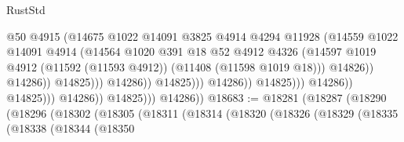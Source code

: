 \begin{lexlean}{RustStd}
\begin{coremodule}
                                                        @50
                                                        @4915
                                                        (@14675
                                                          @1022
                                                          @14091
                                                          @3825
                                                          @4914
                                                          @4294
                                                          @11928
                                                          (@14559
                                                            @1022
                                                            @14091
                                                            @4914
                                                            (@14564
                                                              @1020
                                                              @391
                                                              @18
                                                              @52
                                                              @4912
                                                              @4326
                                                              (@14597
                                                                @1019
                                                                @4912
                                                                (@11592 (@11593 @4912))
                                                                (@11408 (@11598 @1019 @18)))
                                                              @14826))
                                                          @14286))
                                                      @14825)))
                                                @14286))
                                            @14825)))
                                      @14286))
                                  @14825)))
                            @14286))
                        @14825)))
                  @14286))
              @14825)))
        @14286))
@18683 := @18281
    (@18287
      (@18290
        (@18296
          (@18302
            (@18305
              (@18311
                (@18314
                  (@18320
                    (@18326
                      (@18329
                        (@18335
                          (@18338
                            (@18344
                              (@18350

\end{coremodule}
\end{lexlean}
